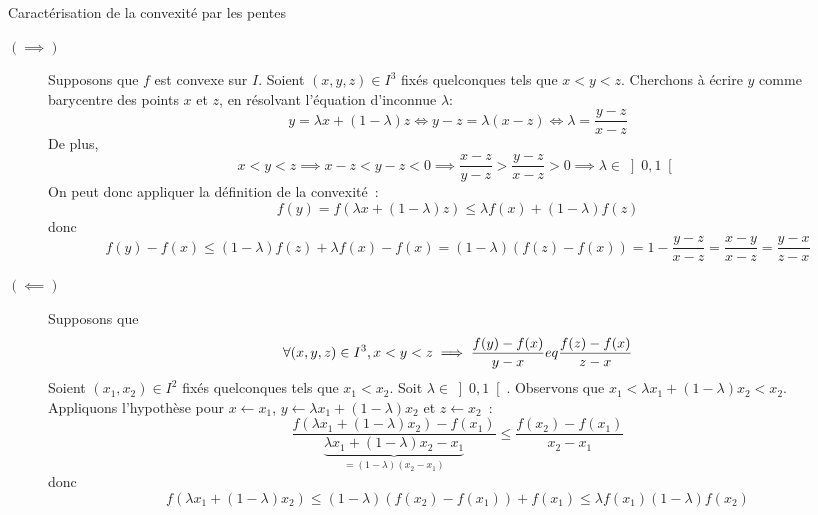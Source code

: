 \documentclass{article}
\renewenvironment{question_kholle}[2][ ]
{
	\subsection{\texorpdfstring{#2}{}}
	\notblank{#1}
	{
		\noindent #1
		\bigbreak
	}
	{}
	\begin{proof}
}
{
	\end{proof}
}
\begin{document}
\begin{question_kholle}{Caractérisation de la convexité par les pentes}
	\begin{description}
		\item[$(\implies )$] Supposons que $f$ est convexe sur $I$. Soient $(x,y,z)\in I^{3}$ fixés quelconques tels que $x<y<z$. Cherchons à écrire $y$ comme barycentre des points $x$ et $z$, en résolvant l’équation d’inconnue $\lambda$:
		      \[
			      y=\lambda x + (1-\lambda)z \iff y-z = \lambda(x-z) \iff  \lambda=\frac{y-z}{x-z}
		      \]
		      De plus,
		      \[
			      x<y<z \implies x-z<y-z<0 \implies \frac{x-z}{y-z}>\frac{y-z}{x-z}>0 \implies \lambda\in \left]0,1\right[
		      \]
		      On peut donc appliquer la définition de la convexité~:
		      \[
			      f(y)=f(\lambda x+(1-\lambda)z) \leq \lambda f(x)+(1-\lambda)f(z)
		      \]
		      donc
		      \[
			      f(y)-f(x)\leq (1-\lambda)f(z)+\lambda f(x) - f(x) = (1-\lambda)(f(z)-f(x)) = 1-\frac{y-z}{x-z}= \frac{x-y}{x-z} = \frac{y-x}{z-x}
		      \]

		\item [$(\impliedby)$] Supposons que
		      \[
			      \forall (x,y,z)\in I^{3}, x<y<z \implies  \frac{f(y)-f(x)}{y-x}\\eq \frac{f(z)-f(x)}{z-x}
		      \]
		      Soient $(x_{1}, x_{2})\in I^{2}$ fixés quelconques tels que $x_{1}<x_{2}$. Soit $\lambda\in\left]0,1\right[$. Observons que $x_{1}<\lambda x_{1}+(1-\lambda)x_{2}<x_{2}$.\\ Appliquons l’hypothèse pour $x\leftarrow x_{1}$, $y\leftarrow \lambda x_{1} + (1-\lambda)x_{2}$ et $z\leftarrow x_{2}$~:
		      \[
			      \frac{f(\lambda x_{1} + (1-\lambda)x_{2}) - f(x_{1})}{\underbrace{\lambda x_{1}+(1-\lambda)x_{2} - x_{1}}_{=(1-\lambda)(x_{2}-x_{1})}} \leq \frac{f(x_{2})-f(x_{1})}{x_{2}-x_{1}}
		      \]
		      donc
		      \[
			      f(\lambda x_{1}+(1-\lambda)x_{2}) \leq (1-\lambda)\left(f(x_{2})-f(x_{1})\right) + f(x_{1}) \leq \lambda f(x_{1})(1-\lambda)f(x_{2})
		      \]
	\end{description}
\end{question_kholle}
\end{document}
